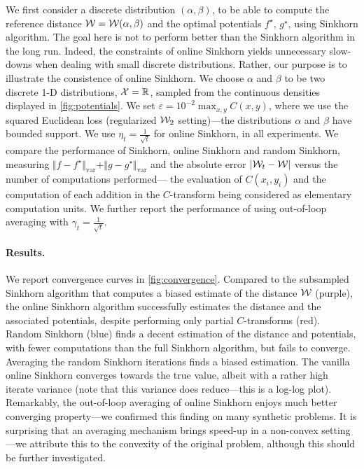 We first consider a discrete distribution $(\alpha, \beta)$, to be able to
compute the reference distance $\mathcal{W} = \mathcal{W}(\alpha, \beta)$ and the optimal potentials $f^\star$,
$g^\star$, using Sinkhorn algorithm. The goal here is not to perform better
than the Sinkhorn algorithm in the long run. Indeed, the constraints of online
Sinkhorn yields unnecessary slow-downs when dealing with small discrete
distributions. Rather, our purpose is to illustrate the consistence of online
Sinkhorn. We choose $\alpha$ and $\beta$ to be two discrete 1-D distributions,
$\mathcal{X}=\mathbb{R}$, sampled from the continuous densities displayed in
\autoref{fig:potentials}. We set $\varepsilon = 10^{-2} \max_{x,y}
C(x,y)$, where we use the squared Euclidean loss (regularized $\mathcal{W}_2$
setting)---the distributions $\alpha$ and $\beta$ have bounded support. We use $\eta_t =
\frac{1}{\sqrt{t}}$ for online Sinkhorn, in all experiments. We compare the
performance of Sinkhorn, online Sinkhorn and random Sinkhorn, measuring $\Vert f
- f^\star \Vert_{\text{var}} + \Vert g - g^\star \Vert_{\text{var}}$ and the
absolute error $| \mathcal{W}_t - \mathcal{W} |$ versus the number of computations performed---
the evaluation of $C(x_i, y_i)$ and the computation of each addition in the
$C$-transform being considered as elementary computation units. We further
report the performance of using out-of-loop averaging with $\gamma_t = \frac{1}{\sqrt{t}}$.

\paragraph{Results.} We report convergence curves in \autoref{fig:convergence}.
Compared to the subsampled Sinkhorn algorithm that computes a biased estimate of
the distance $\mathcal{W}$ (purple), the online Sinkhorn algorithm successfully
estimates the distance and the associated potentials, despite performing only
partial $C$-transforms (red). Random Sinkhorn (blue) finds a decent estimation
of the distance and potentials, with fewer computations than the full Sinkhorn
algorithm, but fails to converge. Averaging the random Sinkhorn iterations finds
a biased estimation. The vanilla online Sinkhorn converges towards the true
value, albeit with a rather high iterate variance (note that this variance does
reduce---this is a log-log plot). Remarkably, the out-of-loop averaging of
online Sinkhorn enjoys much better converging property---we confirmed this
finding on many synthetic problems. It is surprising that an averaging mechanism
brings speed-up in a non-convex setting---we attribute this to the convexity of
the original problem, although this should be further investigated.

